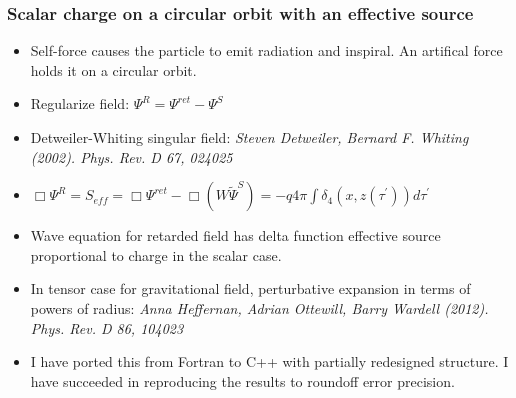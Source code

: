 \documentclass{beamer}
\begin{document}
\begin{frame}
  \frametitle{Scalar charge on a circular orbit with an effective source}
  \begin{itemize}
  \item Self-force causes the particle to emit radiation and inspiral. An artifical force holds it on a circular orbit.
  \item Regularize field: $\Psi^R=\Psi^{ret}-\Psi^S$
  \item Detweiler-Whiting singular field: {\em Steven Detweiler, Bernard F. Whiting (2002). Phys. Rev. D 67, 024025}
  \item $\Box\Psi^R=S_{eff}=\Box\Psi^{ret}-\Box(W\tilde{\Psi}^S)=-q4\pi\int\delta_4(x,z(\tau^\prime))d\tau^\prime$
  \item Wave equation for retarded field has delta function effective source proportional to charge in the scalar case.
  \item In tensor case for gravitational field, perturbative expansion in terms of powers of radius: {\em Anna Heffernan, Adrian Ottewill, Barry Wardell (2012). Phys. Rev. D 86, 104023}
  \item I have ported this from Fortran to C++ with partially redesigned structure. I have succeeded in reproducing the results to roundoff error precision.  
  \end{itemize}
\end{frame}
\end{document}
